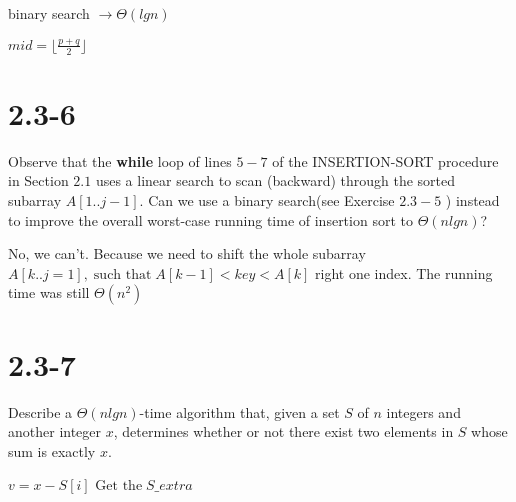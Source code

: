 \documentclass[a4paper, 11pt, UTF8]{article}
\begin{document}
\begin{algorithm}
    \caption{binary search $ \to \Theta(lgn)$}
    \begin{algorithmic}[1]

                \State  {}
            \EndIf
            \State  $mid = \lfloor \frac{p+q}{2} \rfloor$ 
                \State \Return {}
                \State \Return {}
            \Else
                \State {}
            \EndIf
        \EndFunction
    \end{algorithmic}
\end{algorithm}


\section*{2.3-6}
Observe that the \textbf{while} loop of lines $5-7$ of the INSERTION-SORT
procedure in Section $2.1$ uses a linear search to scan (backward) through the
sorted subarray $A[1..j-1]$. Can we use a binary search(see Exercise  $2.3-5$ )
instead to improve the overall worst-case running time of insertion sort to 
$\Theta(nlgn)$?

No, we can't. Because we need to shift the whole subarray 
$A[k..j=1], \; \text{such that} \; A[k-1] < key < A[k]$ right one index. The
running time was still $\Theta(n^2)$


\section*{2.3-7 \FiveStar}
Describe a $\Theta(nlgn)$-time algorithm that, given a set $S$ of $n$ integers and
another integer $x$, determines whether or not there exist two elements in $S$ 
whose sum is exactly $x$.

\begin{algorithm}
    \begin{algorithmic}[1]
    \State {}
            \State $v = x - S[i]$ 
            \State $\text{Get the}\; S\_extra$
            \State {}
        \EndFor
    \EndFunction
    \end{algorithmic}
\end{algorithm}
\end{document}
